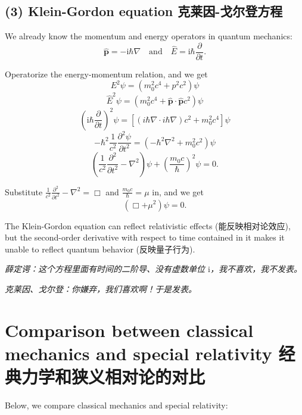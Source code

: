 \subsection*{(3) Klein-Gordon equation
克莱因-戈尔登方程}\label{klein-gordon-equation-ux514bux83b1ux56e0-ux6208ux5c14ux767bux65b9ux7a0b}

We already know the momentum and energy operators in quantum mechanics:
\[\hat{\boldsymbol{p}} = - \mathrm{i} \hbar \nabla \quad \text{and} \quad \hat{E} = \mathrm{i} \hbar \frac{\partial}{\partial t}.\]

Operatorize the energy-momentum relation, and we get
\[E^2 \psi = (m_0^2 c^4 + p^2 c^2) \psi\]
\[\hat{E}^2 \psi = (m_0^2 c^4 + \hat{\boldsymbol{p}} \cdot \hat{\boldsymbol{p}} c^2) \psi\]
\[\left( \mathrm{i} \hbar \frac{\partial}{\partial t} \right)^2 \psi = \left[ \left( {i} \hbar \nabla \cdot {i} \hbar \nabla \right) c^2 + m_0^2 c^4 \right] \psi\]
\[- \hbar^2 \frac{1}{c^2} \frac{\partial^2 \psi}{\partial t^2} = \left( - \hbar^2 \nabla^2 + m_0^2 c^2 \right) \psi\]
\[\left( \frac{1}{c^2} \frac{\partial^2 }{\partial t^2} - \nabla^2 \right) \psi + \left( \frac{m_0c}{\hbar} \right)^2 \psi = 0.\]

Substitute
\(\displaystyle \frac{1}{c^2} \frac{\partial^2 }{\partial t^2} - \nabla^2 = \Box\)
and \(\displaystyle \frac{m_0c}{\hbar} = \mu\) in, and we get
\[\left( \Box + \mu^2 \right) \psi = 0.\]

The Klein-Gordon equation can reflect relativistic effects
(能反映相对论效应), but the second-order derivative with respect to time
contained in it makes it unable to reflect quantum behavior
(反映量子行为).

\emph{薛定谔：这个方程里面有时间的二阶导、没有虚数单位
\({\mathrm{i}}\)，我不喜欢，我不发表。}

\emph{克莱因、戈尔登：你嫌弃，我们喜欢啊！于是发表。}

\section[Classical mechanics VS. special
relativity 对比经典力学和狭义相对论]{Comparison between classical mechanics and special
relativity
经典力学和狭义相对论的对比}\label{comparison-between-classical-mechanics-and-special-relativity-ux7ecfux5178ux529bux5b66ux548cux72edux4e49ux76f8ux5bf9ux8bbaux7684ux5bf9ux6bd4}

Below, we compare classical mechanics and special relativity:

